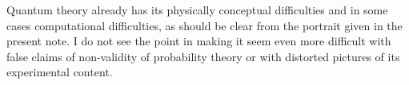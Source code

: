 \documentclass[\ifafour a4paper,12pt,\else a5paper,10pt,\fi%
onecolumn,oneside,article,%
british%
]{memoir}
\makeatletter
\theoremstyle{remark}
\theoremstyle{innote}
\def\sum{\DOTSI\sumop\slimits@}
\newcommand*{\mathte}[1]{\textbf{\textit{\textsf{#1}}}}
\newcommand*{\de}{\partialup}%
\newcommand*{\p}{\mathrm{P}}%
\renewcommand*{\|}[1][]{\nonscript\,#1\vert\nonscript\;\mathopen{}}
\newcommand*{\tsum}{\mathop{\textstyle\sum}\nolimits}
\newcommand*{\yM}{\mathte{M}}
\makeatother
\begin{document}
Quantum theory already has its physically conceptual difficulties and in
some cases computational difficulties, as should be clear from the portrait
given in the present note. I do not see the point in making it seem even
more difficult with false claims of non-validity of probability theory or
with distorted pictures of its experimental content.









\end{document}
